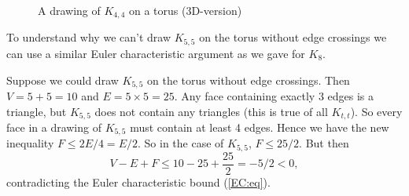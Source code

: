 \documentclass[12pt]{article}
\begin{document}
\begin{figure}[h!]
    \begin{center}

            \end{center}
\caption{A drawing of $K_{4,4}$ on a torus (3D-version)}\label{K44:3d}
        \end{figure}

To understand why we can't draw $K_{5,5}$ on the torus without edge crossings we can use a similar Euler characteristic argument as we gave for $K_8$. 

Suppose we could draw $K_{5,5}$ on the torus without edge crossings. Then $V = 5 + 5 = 10$ and $E = 5 \times 5 = 25$. Any face containing exactly 3 edges is a triangle, but $K_{5,5}$ does not contain any triangles (this is true of all $K_{t,t}$). So every face in a drawing of $K_{5,5}$ must contain at least 4 edges. Hence we have
the new inequality $F \le 2E/4 = E/2$. So in the case of $K_{5,5}$, $F \le 25/2$. But then
\[
V- E + F \le 10 - 25 + \frac{25}{2} = -5/2 <0,
\] contradicting the Euler characteristic bound (\ref{EC:eq}).
\fi
\end{document}
